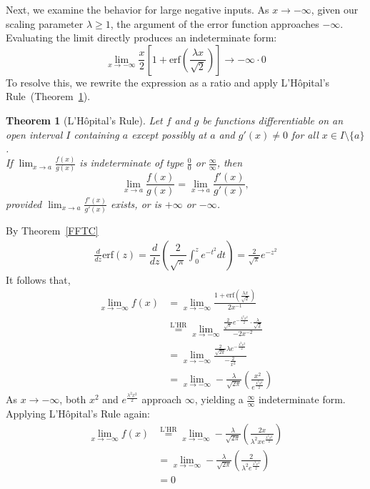 \documentclass[11pt]{article}
\newtheorem{theorem}{Theorem}[section]
\begin{document}
\noindent Next, we examine the behavior for large negative inputs. As $x \to -\infty$, given our scaling parameter $\lambda \geq 1$, the argument of the error function approaches $-\infty$. Evaluating the limit directly produces an indeterminate form:
\begin{equation*}
\lim_{x \to -\infty} \frac{x}{2} \left[ 1 + \text{erf}\left( \frac{\lambda x}{\sqrt{2}} \right) \right] \to -\infty \cdot 0
\end{equation*}
To resolve this, we rewrite the expression as a ratio and apply L'Hôpital's Rule~(Theorem~\ref{thm:lhospital}).
\begin{theorem}[L'H\^opital's Rule]
Let $f$ and $g$ be functions differentiable on an open interval $I$ containing $a$ except possibly at $a$ and $g'(x) \neq 0$ for all $x \in I \setminus \{a\}$.\\

\noindent If $\displaystyle\lim_{x \to a} \frac{f(x)}{g(x)}$ is indeterminate of type $\frac{0}{0}$ or $\frac{\infty}{\infty}$, then
$$
\lim_{x \to a} \frac{f(x)}{g(x)} = \lim_{x \to a} \frac{f'(x)}{g'(x)},
$$
provided $\displaystyle\lim_{x \to a} \frac{f'(x)}{g'(x)}$ exists, or is $+\infty$ or $-\infty$.
\label{thm:lhospital}
\end{theorem}
\noindent By Theorem~\ref{FFTC}  
\begin{align*}
\frac{d}{dz}\text{erf}(z) = \dfrac{d}{dz}\left(\dfrac{2}{\sqrt{\pi}}\int_{0}^{z} e^{-t^{2}}dt\right)= \frac{2}{\sqrt{\pi}}e^{-z^2}
\end{align*}
\noindent It follows that,
\begin{align*}
\lim_{x \to -\infty} f(x) &= \lim_{x \to -\infty} \frac{1 + \text{erf}\left( \frac{\lambda x}{\sqrt{2}} \right)}{2 x^{-1}} \\
&\overset{\text{L'HR}}{=} \lim_{x \to -\infty} \frac{ \frac{2}{\sqrt{\pi}} e^{-\frac{\lambda^2 x^2}{2}} \cdot \frac{\lambda}{\sqrt{2}} }{ -2 x^{-2} } \\
&= \lim_{x \to -\infty} \frac{ \frac{2}{\sqrt{2\pi}} \lambda e^{-\frac{\lambda^2 x^2}{2}} }{ -\frac{2}{x^2} } \\
&= \lim_{x \to -\infty} -\frac{\lambda}{\sqrt{2\pi}} \left( \frac{x^2}{e^{\frac{\lambda^2 x^2}{2}}} \right)
\end{align*}
As $x \to -\infty$, both $x^2$ and $e^{\frac{\lambda^2 x^2}{2}}$ approach $\infty$, yielding a $\frac{\infty}{\infty}$ indeterminate form. Applying L'Hôpital's Rule again:
\begin{align*}
\lim_{x \to -\infty} f(x) &\overset{\text{L'HR}}{=} \lim_{x \to -\infty} -\frac{\lambda}{\sqrt{2\pi}} \left( \frac{2x}{\lambda^2 x e^{\frac{\lambda^2 x^2}{2}}} \right) \\
&= \lim_{x \to -\infty} -\frac{\lambda}{\sqrt{2\pi}} \left( \frac{2}{\lambda^2 e^{\frac{\lambda^2 x^2}{2}}} \right) \\
&= 0
\end{align*}
\end{document}
